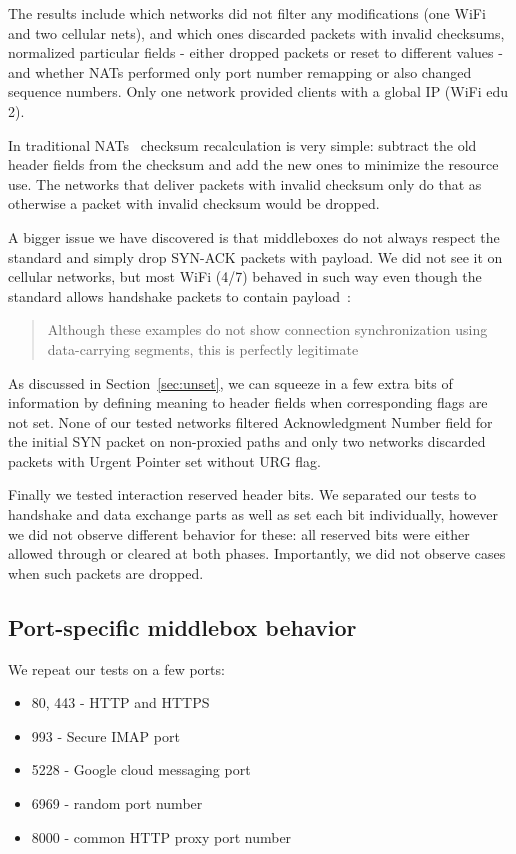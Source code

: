 \documentclass{sig-alternate-10pt}
\begin{document}
The results include which networks did not filter any modifications (one WiFi and two cellular nets), and which ones discarded packets with invalid checksums, normalized particular fields - either dropped packets or reset to different values - and whether NATs performed only port number remapping or also changed sequence numbers. Only one network provided clients with a global IP (WiFi edu 2).

In traditional NATs~\cite{Egevang:tu} checksum recalculation is very simple: subtract the old header fields from the checksum and add the new ones to minimize the resource use. The networks that deliver packets with invalid checksum only do that as otherwise a packet with invalid checksum would be dropped.

A bigger issue we have discovered is that middleboxes do not always respect the standard and simply drop SYN-ACK packets with payload. We did not see it on cellular networks, but most WiFi (4/7) behaved in such way even though the standard allows handshake packets to contain payload~\cite{Postel:3EDyoxP_,Chu:2011tn}:

\begin{quotation}
    Although these examples do not show connection synchronization using data-carrying segments, this is perfectly legitimate
\end{quotation}

As discussed in Section~\ref{sec:unset}, we can squeeze in a few extra bits of information by defining meaning to header fields when corresponding flags are not set. None of our tested networks filtered Acknowledgment Number field for the initial SYN packet on non-proxied paths and only two networks discarded packets with Urgent Pointer set without URG flag.

Finally we tested interaction reserved header bits. We separated our tests to handshake and data exchange parts as well as set each bit individually, however we did not observe different behavior for these: all reserved bits were either allowed through or cleared at both phases. Importantly, we did not observe cases when such packets are dropped.


\subsection{Port-specific middlebox behavior}
\label{sec:portspec}

We repeat our tests on a few ports:
\begin{itemize}
    \item 80, 443 - HTTP and HTTPS
    \item 993 - Secure IMAP port
    \item 5228 - Google cloud messaging port
    \item 6969 - random port number
    \item 8000 - common HTTP proxy port number
\end{itemize}
\end{document}
